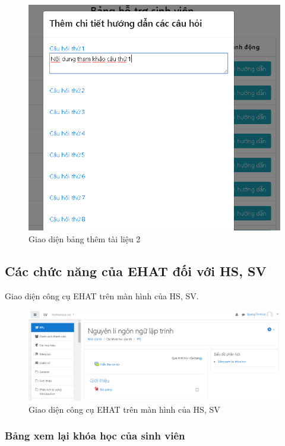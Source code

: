 \begin{center}
	\begin{figure}[htp]
		\begin{center}
			\includegraphics[width=0.6\linewidth]{img/31}
		\end{center}
		\caption{Giao diện bảng thêm tài liệu 2}
		\label{refhinh63}
	\end{figure}
\end{center}

\newpage
\subsection*{Các chức năng của EHAT đối với HS, SV}

Giao diện công cụ EHAT trên màn hình của HS, SV.

\begin{center}
	\begin{figure}[htp]
		\begin{center}
			\includegraphics[width=1\linewidth]{img/32}
		\end{center}
		\caption{Giao diện công cụ EHAT trên màn hình của HS, SV}
		\label{refhinh64}
	\end{figure}
\end{center}

\newpage
\subsubsection*{Bảng xem lại khóa học của sinh viên}

